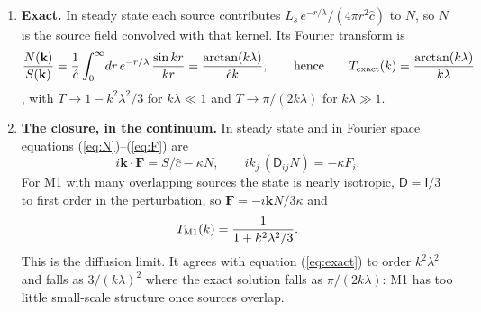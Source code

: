 \documentclass[11pt]{article}
\newcommand{\chat}{\hat{c}}
\begin{document}
\begin{enumerate}
\item \textbf{Exact.} In steady state each source contributes $L_s\,e^{-r/\lambda}/(4\pi r^2\chat)$ to $N$,
so $N$ is the source field convolved with that kernel. Its Fourier transform is
\begin{equation}
\frac{N(\mathbf k)}{S(\mathbf k)}=\frac{1}{\chat}\int_0^\infty\!dr\,e^{-r/\lambda}\,\frac{\sin kr}{kr}
=\frac{\arctan(k\lambda)}{\chat k},
\qquad\hbox{hence}\qquad
T_{\rm exact}(k)=\frac{\arctan(k\lambda)}{k\lambda}\label{eq:exact}
\end{equation}
\citep[][eq.~2]{gnedin25}, with $T\to1-k^2\lambda^2/3$ for $k\lambda\ll1$ and $T\to\pi/(2k\lambda)$ for
$k\lambda\gg1$.
\item \textbf{The closure, in the continuum.} In steady state and in Fourier space equations
(\ref{eq:N})--(\ref{eq:F}) are
\begin{equation}
i\mathbf k\cdot\mathbf F=S/\chat-\kappa N,\qquad i k_j\,(\mathsf D_{ij}N)=-\kappa F_i .\label{eq:steady}
\end{equation}
For M1 with many overlapping sources the state is nearly isotropic, $\mathsf D=\mathsf I/3$ to first
order in the perturbation, so $\mathbf F=-i\mathbf kN/3\kappa$ and
\begin{equation}
T_{\rm M1}(k)=\frac{1}{1+k^2\lambda^2/3}.\label{eq:m1lin}
\end{equation}
This is the diffusion limit. It agrees with equation (\ref{eq:exact}) to order $k^2\lambda^2$ and falls as
$3/(k\lambda)^2$ where the exact solution falls as $\pi/(2k\lambda)$: M1 has too little small-scale
structure once sources overlap.


\end{enumerate}
\end{document}
